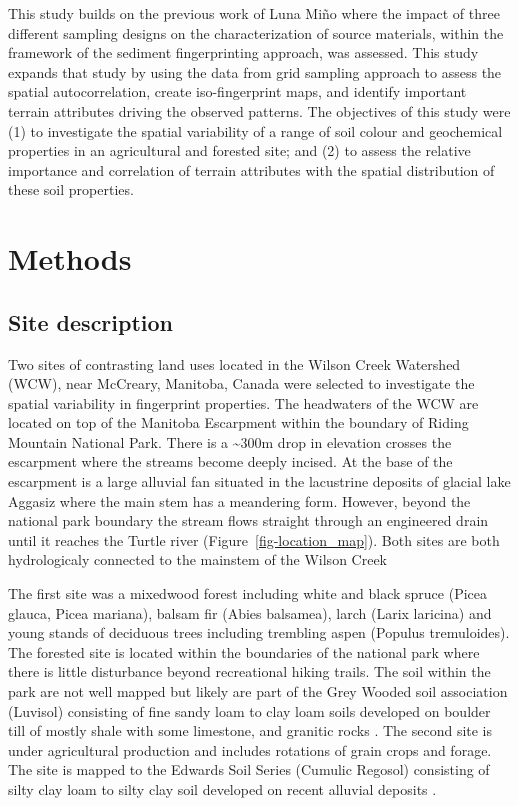 \documentclass[
  number]{elsarticle}
\begin{document}
This study builds on the previous work of Luna Miño \citep{lunamiño2024}
where the impact of three different sampling designs on the
characterization of source materials, within the framework of the
sediment fingerprinting approach, was assessed. This study expands that
study by using the data from grid sampling approach to assess the
spatial autocorrelation, create iso-fingerprint maps, and identify
important terrain attributes driving the observed patterns. The
objectives of this study were (1) to investigate the spatial variability
of a range of soil colour and geochemical properties in an agricultural
and forested site; and (2) to assess the relative importance and
correlation of terrain attributes with the spatial distribution of these
soil properties.

\section{Methods}\label{methods}

\subsection{Site description}\label{site-description}

Two sites of contrasting land uses located in the Wilson Creek Watershed
(WCW), near McCreary, Manitoba, Canada were selected to investigate the
spatial variability in fingerprint properties. The headwaters of the WCW
are located on top of the Manitoba Escarpment within the boundary of
Riding Mountain National Park. There is a \textasciitilde300m drop in
elevation crosses the escarpment where the streams become deeply
incised. At the base of the escarpment is a large alluvial fan situated
in the lacustrine deposits of glacial lake Aggasiz where the main stem
has a meandering form. However, beyond the national park boundary the
stream flows straight through an engineered drain until it reaches the
Turtle river (Figure~\ref{fig-location_map}). Both sites are both
hydrologicaly connected to the mainstem of the Wilson Creek

The first site was a mixedwood forest including white and black spruce
(Picea glauca, Picea mariana), balsam fir (Abies balsamea), larch (Larix
laricina) and young stands of deciduous trees including trembling aspen
(Populus tremuloides). The forested site is located within the
boundaries of the national park where there is little disturbance beyond
recreational hiking trails. The soil within the park are not well mapped
but likely are part of the Grey Wooded soil association (Luvisol)
consisting of fine sandy loam to clay loam soils developed on boulder
till of mostly shale with some limestone, and granitic rocks
\citep{ehrlich1958}. The second site is under agricultural production
and includes rotations of grain crops and forage. The site is mapped to
the Edwards Soil Series (Cumulic Regosol) consisting of silty clay loam
to silty clay soil developed on recent alluvial deposits
\citep{ehrlich1958}.
\end{document}

